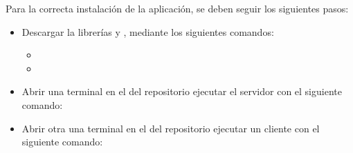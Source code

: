 Para la correcta instalación de la aplicación, se deben seguir los siguientes
pasos:
\begin{itemize}
    \item Descargar la librerías  y , mediante los
    siguientes comandos:
    \begin{itemize}
        \item {}
        \item {}
    \end{itemize}
    \item Abrir una terminal en el  del repositorio ejecutar el
    servidor con el siguiente comando: 
    \item Abrir otra una terminal en el  del repositorio ejecutar un
    cliente con el siguiente comando: 
\end{itemize}